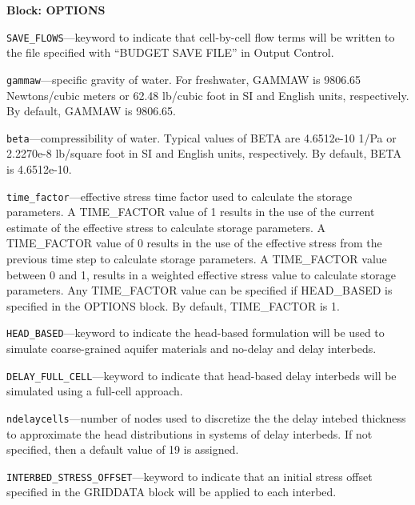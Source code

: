 
\item \textbf{Block: OPTIONS}

\begin{description}
\item \texttt{SAVE\_FLOWS}---keyword to indicate that cell-by-cell flow terms will be written to the file specified with ``BUDGET SAVE FILE'' in Output Control.

\item \texttt{gammaw}---specific gravity of water. For freshwater, GAMMAW is 9806.65 Newtons/cubic meters or 62.48 lb/cubic foot in SI and English units, respectively. By default, GAMMAW is 9806.65.

\item \texttt{beta}---compressibility of water. Typical values of BETA are 4.6512e-10 1/Pa or 2.2270e-8 lb/square foot in SI and English units, respectively. By default, BETA is 4.6512e-10.

\item \texttt{time\_factor}---effective stress time factor used to calculate the storage parameters. A TIME\_FACTOR value of 1 results in the use of the current estimate of the effective stress to calculate storage parameters. A TIME\_FACTOR value of 0 results in the use of the effective stress from the previous time step to calculate storage parameters. A TIME\_FACTOR value between 0 and 1, results in a weighted effective stress value to calculate storage parameters. Any TIME\_FACTOR value can be specified if HEAD\_BASED is specified in the OPTIONS block. By default, TIME\_FACTOR is 1.

\item \texttt{HEAD\_BASED}---keyword to indicate the head-based formulation will be used to simulate coarse-grained aquifer materials and no-delay and delay interbeds.

\item \texttt{DELAY\_FULL\_CELL}---keyword to indicate that head-based delay interbeds will be simulated using a full-cell approach.

\item \texttt{ndelaycells}---number of nodes used to discretize the the delay intebed thickness to approximate the head distributions in systems of delay interbeds. If not specified, then a default value of 19 is assigned.

\item \texttt{INTERBED\_STRESS\_OFFSET}---keyword to indicate that an initial stress offset specified in the GRIDDATA block will be applied to each interbed.


\end{description}
